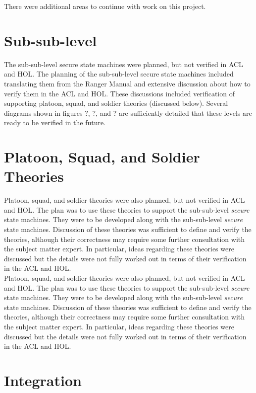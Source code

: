 
There were additional areas to continue with work on this project.

\section*{Sub-sub-level}
\label{sec:sub-sub-level}

The sub-sub-level secure state machines were planned, but not verified in ACL and HOL.  The planning
of the sub-sub-level secure state machines included translating them from the Ranger Manual and extensive
discussion about how to verify them in the ACL and HOL.  These discussions included verification of
supporting platoon, squad, and soldier theories (discussed below).  Several diagrams shown in figures
?, ?, and ?  are sufficiently detailed that these levels are ready to be verified in the future.

\section*{Platoon, Squad, and Soldier Theories}
\label{sec:plat-squad-sold}

Platoon, squad, and soldier theories were also planned, but not verified in ACL and HOL.  The plan
was to use these theories to support the sub-sub-level \emph{secure} state machines.  They were to be developed
along with the sub-sub-level \emph{secure} state machines.   Discussion of these theories was sufficient to define
and verify the theories, although their correctness may require some further consultation with the subject
matter expert.   In particular, ideas regarding these theories were discussed but the details were not fully
worked out in terms of their verification in the ACL and HOL.\\

Platoon, squad, and soldier theories were also planned, but not verified in ACL and HOL.  The plan was
to use these theories to support the sub-sub-level \emph{secure} state machines.  They were to be developed
along with the sub-sub-level \emph{secure} state machines.   Discussion of these theories was sufficient to
define and verify the theories, although their correctness may require some further consultation with the
subject matter expert.   In particular, ideas regarding these theories were discussed but the details were
not fully worked out in terms of their verification in the ACL and HOL.

\section*{Integration}
\label{sec:integration}

